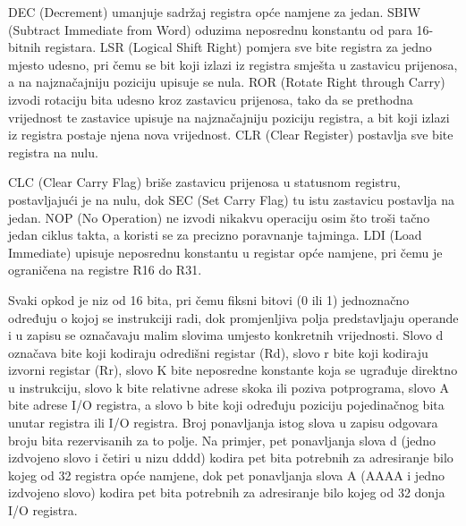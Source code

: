 DEC (\foreignlanguage{english}{Decrement}) umanjuje sadržaj registra
opće namjene za jedan. SBIW
(\foreignlanguage{english}{Subtract Immediate from Word}) oduzima
neposrednu konstantu od para 16-bitnih registara. LSR
(\foreignlanguage{english}{Logical Shift Right}) pomjera sve bite
registra za jedno mjesto udesno, pri čemu se bit koji izlazi iz registra
smješta u zastavicu prijenosa, a na najznačajniju poziciju upisuje se
nula. ROR (\foreignlanguage{english}{Rotate Right through Carry}) izvodi
rotaciju bita udesno kroz zastavicu prijenosa, tako da se prethodna
vrijednost te zastavice upisuje na najznačajniju poziciju registra, a
bit koji izlazi iz registra postaje njena nova vrijednost. CLR
(\foreignlanguage{english}{Clear Register}) postavlja sve bite registra
na nulu.

CLC (\foreignlanguage{english}{Clear Carry Flag}) briše zastavicu
prijenosa u statusnom registru, postavljajući je na nulu, dok SEC
(\foreignlanguage{english}{Set Carry Flag}) tu istu zastavicu postavlja
na jedan. NOP (\foreignlanguage{english}{No Operation}) ne izvodi
nikakvu operaciju osim što troši tačno jedan ciklus takta, a koristi se
za precizno poravnanje tajminga. LDI
(\foreignlanguage{english}{Load Immediate}) upisuje neposrednu konstantu
u registar opće namjene, pri čemu je ograničena na registre R16 do R31.

Svaki opkod je niz od 16 bita, pri čemu fiksni bitovi
(0 ili 1) jednoznačno određuju o kojoj se instrukciji radi, dok
promjenljiva polja predstavljaju operande i u zapisu se označavaju malim
slovima umjesto konkretnih vrijednosti. Slovo d označava bite koji
kodiraju odredišni registar (Rd), slovo r bite koji kodiraju izvorni
registar (Rr), slovo K bite neposredne konstante koja se ugrađuje
direktno u instrukciju, slovo k bite relativne adrese skoka ili poziva
potprograma, slovo A bite adrese I/O registra, a slovo b bite koji
određuju poziciju pojedinačnog bita unutar registra ili I/O registra.
Broj ponavljanja istog slova u zapisu odgovara broju bita rezervisanih
za to polje. Na primjer, pet ponavljanja slova d (jedno izdvojeno slovo
i četiri u nizu dddd) kodira pet bita potrebnih za adresiranje bilo kojeg
od 32 registra opće namjene, dok pet ponavljanja slova A (AAAA i jedno
izdvojeno slovo) kodira pet bita potrebnih za adresiranje bilo kojeg od
32 donja I/O registra.


